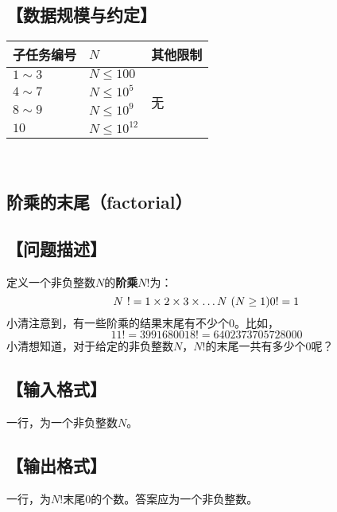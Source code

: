 \documentclass[12pt]{article}
\begin{document}
	\subsection*{\normalsize 【数据规模与约定】}
	\begin{center}
		\begin{tabular}{|p{}<{\centering}|p{}<{\centering}|p{}<{\centering}|}
		\hline
		子任务编号 & $N$ & 其他限制\\
		\hline
		$1 \sim 3$ & $N \le 100$ & \multirow{4}{*}{无}\\
		\cline{1-2}
		$4 \sim 7$ & $N \le 10^5$ & \\
		\cline{1-2}
		$8 \sim 9$ & $N \le 10^9$ & \\
		\cline{1-2}
		$10$ & $N \le 10^{12}$ & \\
		\hline
		\end{tabular}\\
	\end{center}

	\newpage
	\begin{center} \section*{\Large 阶乘的末尾（factorial）} \end{center}
	\pagestyle{fancy}
	\fancyhf{}
	
	\subsection*{\normalsize 【问题描述】}
	定义一个非负整数$N$的\textbf{阶乘}$N!$为：
$$
N~! = 1 \times 2 \times 3 \times \dots N ~(N \ge 1) \\
0! = 1
$$
	小清注意到，有一些阶乘的结果末尾有不少个0。比如，
$$
11! = 39916800
18! = 6402373705728000
$$
	小清想知道，对于给定的非负整数$N$，$N!$的末尾一共有多少个0呢？
	
	\subsection*{\normalsize 【输入格式】}
	一行，为一个非负整数$N$。
	
	\subsection*{\normalsize 【输出格式】}
	一行，为$N!$末尾0的个数。答案应为一个非负整数。
	
\end{document}
